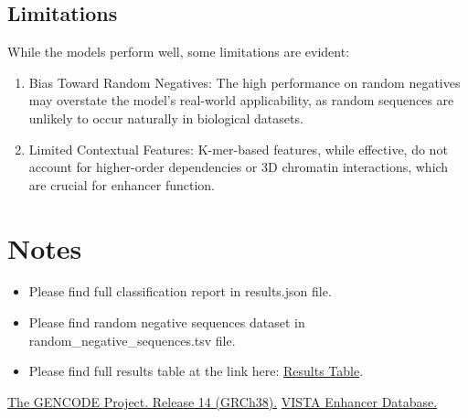 \documentclass[11pt, a4paper, hidelinks]{article}
\begin{document}
\subsection{Limitations}\label{subsec:limitations}
While the models perform well, some limitations are evident:
\begin{enumerate}
    \item Bias Toward Random Negatives: The high performance on random negatives may overstate the model's real-world applicability, as random sequences are unlikely to occur naturally in biological datasets.
    \item Limited Contextual Features: K-mer-based features, while effective, do not account for higher-order dependencies or 3D chromatin interactions, which are crucial for enhancer function.
\end{enumerate}

\section{Notes}\label{sec:notes}

\begin{itemize}
    \item Please find full classification report in results.json file.
    \item Please find random negative sequences dataset in random\_negative\_sequences.tsv file.
    \item Please find full results table at the link here: \href{https://jsongrid.com?data=c1cc3ac1-ce10-4fcc-9612-2ee8df8cedad}{Results Table}.
\end{itemize}

\vspace{\baselineskip}

\begin{thebibliography}{99}
    \href{https://www.gencodegenes.org/human/release_14.html}{The GENCODE Project. Release 14 (GRCh38).}
    \href{https://enhancer.lbl.gov/vista/}{VISTA Enhancer Database.}
\end{thebibliography}
\end{document}
